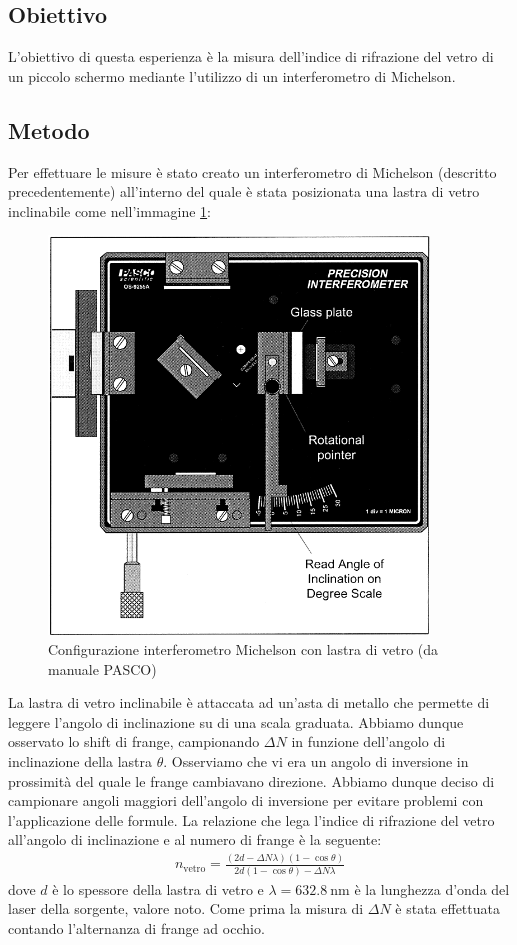 \documentclass[a4paper]{article}
\begin{document}
\subsection{Obiettivo}
L'obiettivo di questa esperienza è la misura dell'indice di rifrazione del vetro di un  piccolo schermo mediante l'utilizzo di un interferometro di Michelson.
\subsection{Metodo}
Per effettuare le misure è stato creato un interferometro di Michelson (descritto precedentemente) all'interno del quale è stata posizionata una lastra di vetro inclinabile come nell'immagine \ref{fig:configurazione-michelson-vetro}:
\begin{figure}[htbp]
\centering
\includegraphics[width=0.9\textwidth]{grafici/Michaelson vetro.png}
\caption{Configurazione interferometro Michelson con lastra di vetro (da manuale PASCO)}
\label{fig:configurazione-michelson-vetro}
\end{figure}
La lastra di vetro inclinabile è attaccata ad un'asta di metallo che permette di leggere l'angolo di inclinazione su di una scala graduata. Abbiamo dunque osservato lo shift di frange, campionando $\Delta N$ in funzione dell'angolo di inclinazione della lastra $\theta$. Osserviamo che vi era un angolo di inversione in prossimità del quale le frange cambiavano direzione. Abbiamo dunque deciso di campionare angoli maggiori dell'angolo di inversione per evitare problemi con l'applicazione delle formule. La relazione che lega l'indice di rifrazione del vetro all'angolo di inclinazione e al numero di frange è la seguente:
\begin{align}
    n_{\text{vetro}} = \frac{(2d - \Delta N \lambda)(1 - \cos\theta)}{2d(1 - \cos\theta) - \Delta N \lambda}
\label{eq:indice-rifrazione-vetro}
\end{align}
dove $d$ è lo spessore della lastra di vetro e $\lambda=\SI{632.8}{\nano\meter}$ è la lunghezza d'onda del laser della sorgente, valore noto.
Come prima la misura di $\Delta N$ è stata effettuata contando l'alternanza di frange ad occhio.
\end{document}
